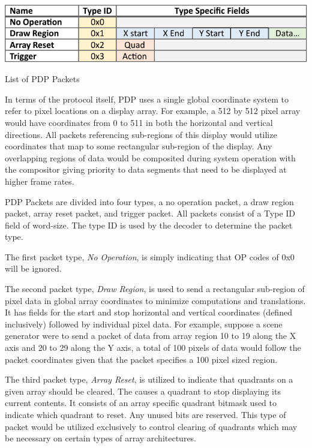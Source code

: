     \begin{table}
        \centering
        \includegraphics[width=1.0\textwidth]{fig/packet_chart.pdf}
        \caption{List of PDP Packets}
        \label{tbl:packets}
    \end{table}

    In terms of the protocol itself, PDP uses a single global coordinate system to refer to pixel locations on a display array. For example, a 512 by 512 pixel array would have coordinates from 0 to 511 in both the horizontal and vertical directions. All packets referencing sub-regions of this display would utilize coordinates that map to some rectangular sub-region of the display. Any overlapping regions of data would be composited during system operation with the compositor giving priority to data segments that need to be displayed at higher frame rates.

    PDP Packets are divided into four types, a no operation packet, a draw region packet, array reset packet, and trigger packet. All packets consist of a Type ID field of word-size. The type ID is used by the decoder to determine the packet type.

    The first packet type, {\it No Operation}, is simply indicating that OP codes of 0x0 will be ignored.

    The second packet type, {\it Draw Region}, is used to send a rectangular sub-region of pixel data in global array coordinates to minimize computations and translations. It has fields for the start and stop horizontal and vertical coordinates (defined inclusively) followed by individual pixel data. For example, suppose a scene generator were to send a packet of data from array region 10 to 19 along the X axis and 20 to 29 along the Y axis, a total of 100 pixels of data would follow the packet coordinates given that the packet specifies a 100 pixel sized region.

    The third packet type, {\it Array Reset}, is utilized to indicate that quadrants on a given array should be cleared. The causes a quadrant to stop displaying its current contents. It consists of an array specific quadrant bitmask used to indicate which quadrant to reset. Any unused bits are reserved. This type of packet would be utilized exclusively to control clearing of quadrants which may be necessary on certain types of array architectures.

